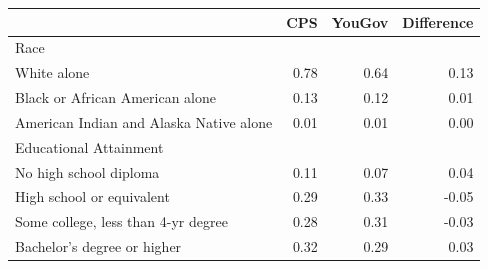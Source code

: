 
\begin{tabular}{lrrr}
\toprule
 & CPS & YouGov & Difference\\
\midrule
Race &  &  & \\
White alone & 0.78 & 0.64 & 0.13\\
Black or African American alone & 0.13 & 0.12 & 0.01\\
American Indian and Alaska Native alone & 0.01 & 0.01 & 0.00\\
Educational Attainment &  &  & \\
\addlinespace
No high school diploma & 0.11 & 0.07 & 0.04\\
High school or equivalent & 0.29 & 0.33 & -0.05\\
Some college, less than 4-yr degree & 0.28 & 0.31 & -0.03\\
Bachelor's degree or higher & 0.32 & 0.29 & 0.03\\
\bottomrule
\end{tabular}
